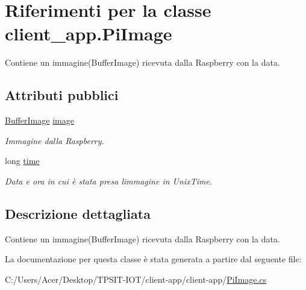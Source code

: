 \hypertarget{classclient__app_1_1_pi_image}{}\section{Riferimenti per la classe client\+\_\+app.\+Pi\+Image}
\label{classclient__app_1_1_pi_image}


Contiene un immagine(\+Buffer\+Image) ricevuta dalla Raspberry con la data.  


\subsection*{Attributi pubblici}
\begin{DoxyCompactItemize}
\item 
\mbox{\label{classclient__app_1_1_pi_image_a69ec8ae557dc022192885ab486c1763e}} 
\mbox{\hyperlink{classclient__app_1_1_buffer_image}{Buffer\+Image}} \mbox{\hyperlink{classclient__app_1_1_pi_image_a69ec8ae557dc022192885ab486c1763e}{image}}
\begin{DoxyCompactList}\small\item\em Immagine dalla Raspberry. \end{DoxyCompactList}\item 
\mbox{\label{classclient__app_1_1_pi_image_a3616f020e6b874c58c930dcaf8a7681e}} 
long \mbox{\hyperlink{classclient__app_1_1_pi_image_a3616f020e6b874c58c930dcaf8a7681e}{time}}
\begin{DoxyCompactList}\small\item\em Data e ora in cui è stata presa l\textquotesingle{}immagine in Unix\+Time. \end{DoxyCompactList}\end{DoxyCompactItemize}


\subsection{Descrizione dettagliata}
Contiene un immagine(\+Buffer\+Image) ricevuta dalla Raspberry con la data. 

La documentazione per questa classe è stata generata a partire dal seguente file\+:\begin{DoxyCompactItemize}
\item 
C\+:/\+Users/\+Acer/\+Desktop/\+T\+P\+S\+I\+T-\/\+I\+O\+T/client-\/app/client-\/app/\mbox{\hyperlink{_pi_image_8cs}{Pi\+Image.\+cs}}\end{DoxyCompactItemize}
